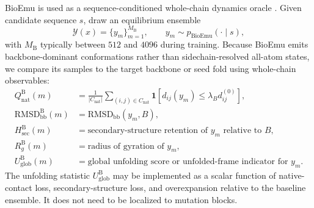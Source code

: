 \documentclass[11pt]{article}
\begin{document}
	BioEmu is used as a sequence-conditioned whole-chain dynamics oracle \citep{lewis2024bioemu}. Given candidate sequence $s$, draw an equilibrium ensemble
	\[
	\mathcal{Y}(x)=\{y_m\}_{m=1}^{M_{\mathrm B}}, \qquad y_m \sim p_{\mathrm{BioEmu}}(\cdot \mid s),
	\]
	with $M_{\mathrm B}$ typically between $512$ and $4096$ during training. Because BioEmu emits backbone-dominant conformations rather than sidechain-resolved all-atom states, we compare its samples to the target backbone or seed fold using whole-chain observables:
	\begin{align}
		Q_{\mathrm{nat}}^{\mathrm B}(m) &= \frac{1}{|C_{\mathrm{nat}}|}\sum_{(i,j)\in C_{\mathrm{nat}}}\mathbf{1}\!\left[d_{ij}(y_m)\leq \lambda_B d_{ij}^{(0)}\right],\\
		\mathrm{RMSD}_{\mathrm{bb}}^{\mathrm B}(m) &= \mathrm{RMSD}_{\mathrm{bb}}(y_m,B),\\
		H_{\mathrm{sec}}^{\mathrm B}(m) &= \text{secondary-structure retention of }y_m\text{ relative to }B,\\
		R_g^{\mathrm B}(m) &= \text{radius of gyration of }y_m,\\
		U_{\mathrm{glob}}^{\mathrm B}(m) &= \text{global unfolding score or unfolded-frame indicator for }y_m.
	\end{align}
	The unfolding statistic $U_{\mathrm{glob}}^{\mathrm B}$ may be implemented as a scalar function of native-contact loss, secondary-structure loss, and overexpansion relative to the baseline ensemble. It does not need to be localized to mutation blocks.
	
\end{document}
